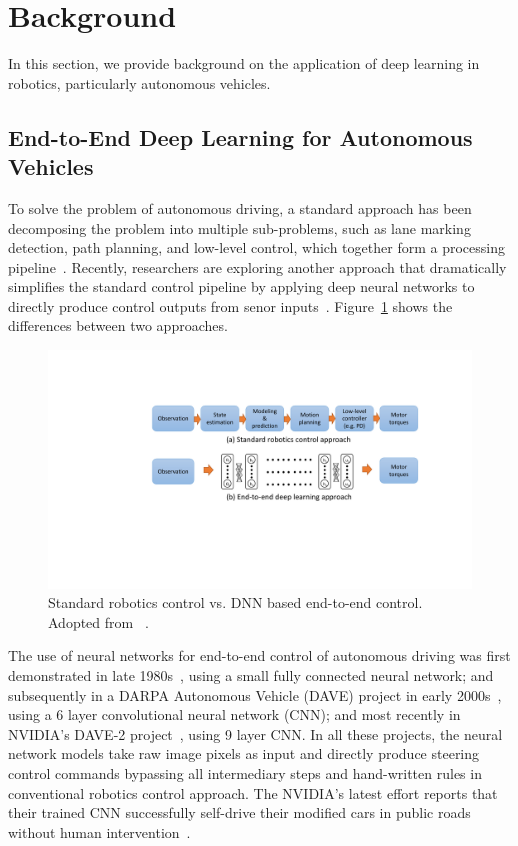 \section{Background} \label{sec:background}

In this section, we provide background on the application of deep
learning in robotics, particularly autonomous vehicles.

\subsection{End-to-End Deep Learning for Autonomous Vehicles}


To solve the problem of autonomous driving, a standard approach has
been decomposing the problem into multiple sub-problems,
such as lane marking detection, path planning, and low-level
control, which together form a processing pipeline~\cite{Bojarski2016}.
Recently, researchers are exploring another approach that dramatically
simplifies the standard control pipeline by applying deep neural
networks to directly produce control outputs from senor
inputs~\cite{Levine2016}. Figure~\ref{fig:end-to-end-control}
shows the differences between two approaches.

\begin{figure}[h]
  \centering
  \includegraphics[width=.5\textwidth]{figs/endtoend_redrawn}
  \caption{Standard robotics control vs. DNN based end-to-end
    control. Adopted from ~\cite{Levine2017cs294}.}
  \label{fig:end-to-end-control}
\end{figure}

The use of neural networks for end-to-end control of autonomous
driving was first demonstrated in late 1980s~\cite{Pomerleau1989},
using a small fully connected neural network; and subsequently in a
DARPA Autonomous Vehicle (DAVE) project in early
2000s~\cite{LeCun:04}, using a 6 layer convolutional neural network
(CNN); and most recently in NVIDIA's DAVE-2
project~\cite{Bojarski2016}, using 9 layer CNN. In all these projects,
the neural network models take raw image pixels as input and directly
produce steering control commands bypassing all intermediary steps and
hand-written rules in conventional robotics control approach. The
NVIDIA's latest effort reports that their trained CNN successfully
self-drive their modified cars in public roads without human
intervention~\cite{Bojarski2016}.

